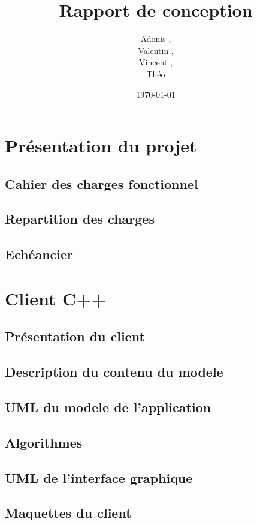 \documentclass[a4paper]{article}
\title{Rapport de conception}
\author{Adonis \bsc{Najimi},\\
 Valentin \bsc{Stern},\\
 Vincent \bsc{Albert},\\
 Théo \bsc{Gerriet}}
\date{\today}
\begin{document}
\maketitle
\newpage

\section{Présentation du projet}
	\subsection{Cahier des charges fonctionnel}
		
	\subsection{Repartition des charges}
		
  \subsection{Echéancier}
		
		
\newpage
\section{Client C++}
	\subsection{Présentation du client}
		
	\subsection{Description du contenu du modele}
		
	\subsection{UML du modele de l'application}
		
	\subsection{Algorithmes}
		
	\subsection{UML de l'interface graphique}
		
	\subsection{Maquettes du client}
		
\end{document}

